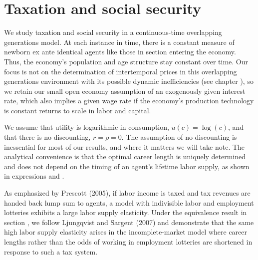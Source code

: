 \section{Taxation and social security}\label{sec:LStaxsoc}%
We study taxation and social security in a continuous-time
overlapping generations model. At each instance in time, there
is a constant measure of newborn ex ante identical agents like
those in section  entering the economy.
Thus, the economy's population and age structure stay constant
over time. Our focus is not on the determination of intertemporal
prices in this overlapping generations environment with its
possible dynamic inefficiencies (see chapter ),
so we retain our small open economy assumption of an exogenously
given interest rate, which also implies a given
wage rate if the economy's production technology is constant
returns to scale in labor and capital.

We assume that utility is logarithmic in consumption,
$u(c) = \log (c)$, and that there is no discounting, $r=\rho=0$.
The assumption of no discounting is inessential for most of
our results, and where it matters we will take note. The analytical
convenience is that the optimal career length is uniquely
determined and does not depend on the timing of an agent's
lifetime labor supply, as shown in expressions
 and .



As emphasized by Prescott (2005), if labor income is taxed
and tax revenues are handed back lump sum to agents, a model
with indivisible labor and employment lotteries exhibits a large
labor supply elasticity. Under the equivalence result in
section , we follow Ljungqvist and Sargent (2007)
and demonstrate that the same high labor supply elasticity arises
in the incomplete-market model where career lengths rather
than the odds of working in employment lotteries are
shortened in response to such a tax system.

